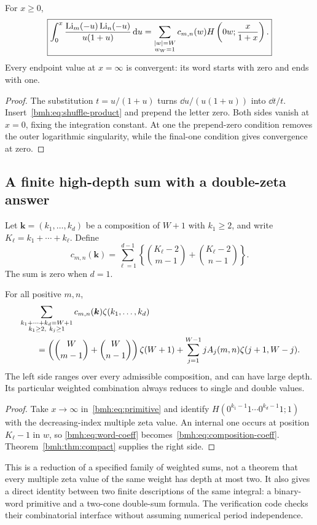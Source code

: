 \begin{theorem}\label{bmh:thm:primitive}
For $x\ge0$,
\begin{equation}\label{bmh:eq:primitive}
 \boxed{\displaystyle
 \int_0^x\frac{\operatorname{Li}_m(-u)\operatorname{Li}_n(-u)}{u(1+u)}\,\mathrm d u
 =\sum_{\substack{|w|=W\\w_W=1}}c_{m,n}(w)
       H\left(0w;\frac{x}{1+x}\right).}
\end{equation}
Every endpoint value at $x=\infty$ is convergent: its word starts with
zero and ends with one.
\end{theorem}
\begin{proof}
The substitution $t=u/(1+u)$ turns $\dd u/(u(1+u))$ into $\dd t/t$.
Insert~\eqref{bmh:eq:shuffle-product} and prepend the letter zero.
Both sides vanish at $x=0$, fixing the integration constant. At one the
prepend-zero condition removes the outer logarithmic singularity, while
the final-one condition gives convergence at zero.
\end{proof}

\subsection{A finite high-depth sum with a double-zeta answer}
Let $\boldsymbol k=(k_1,\ldots,k_d)$ be a composition of $W+1$ with
$k_1\ge2$, and write $K_\ell=k_1+\cdots+k_\ell$. Define
\begin{equation}\label{bmh:eq:composition-coeff}
 c_{m,n}(\boldsymbol k)=\sum_{\ell=1}^{d-1}
 \left\{\binom{K_\ell-2}{m-1}+\binom{K_\ell-2}{n-1}\right\}.
\end{equation}
The sum is zero when $d=1$.

\begin{corollary}\label{bmh:cor:weighted}
For all positive $m,n$,
\begin{align}
 &\sum_{\substack{k_1+\cdots+k_d=W+1\\k_1\ge2,\ k_j\ge1}}
 c_{m,n}(\boldsymbol k)\zeta(k_1,\ldots,k_d)\notag\\
 &\qquad=\left(\binom W{m-1}+\binom W{n-1}\right)\zeta(W+1)
 +\sum_{j=1}^{W-1}jA_j(m,n)\zeta(j+1,W-j).
 \label{bmh:eq:weighted}
\end{align}
The left side ranges over every admissible composition, and can have
large depth. Its particular weighted combination always reduces to
single and double values.
\end{corollary}
\begin{proof}
Take $x\to\infty$ in~\eqref{bmh:eq:primitive} and identify
$H(0^{k_1-1}1\cdots0^{k_d-1}1;1)$ with the decreasing-index multiple
zeta value. An internal one occurs at position $K_\ell-1$ in $w$, so
\eqref{bmh:eq:word-coeff} becomes~\eqref{bmh:eq:composition-coeff}.
Theorem~\ref{bmh:thm:compact} supplies the right side.
\end{proof}
This is a reduction of a specified family of weighted sums, not a theorem
that every multiple zeta value of the same weight has depth at most two.
It also gives a direct identity between two finite descriptions of the
same integral: a binary-word primitive and a two-cone double-sum formula.
The verification code checks their combinatorial interface without
assuming numerical period independence.

